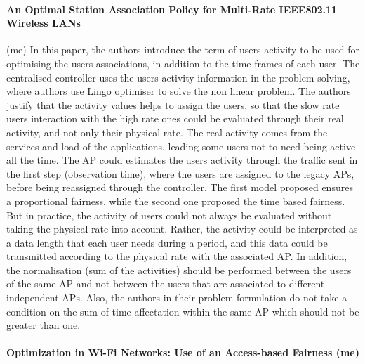 \documentclass[journal,transmag]{IEEEtran}
\begin{document}
\paragraph{An Optimal Station Association Policy for Multi-Rate IEEE802.11 Wireless LANs} (me) \cite{07optimal_association_MSWIM}
In this paper, the authors introduce the term of users activity to be used for optimising the users associations, in addition to the time frames of each user. The centralised controller uses the users activity information in the problem solving, where authors use Lingo optimiser to solve the non linear problem. The authors justify that the activity values helps to assign the users, so that the slow rate users interaction with the high rate ones could be evaluated through their real activity, and not only their physical rate. The real activity comes from the services and load of the applications, leading some users not to need being active all the time. The AP could estimates the users activity through the traffic sent in the first step (observation time), where the users are assigned to the legacy APs, before being reassigned through the controller. The first model proposed ensures a proportional fairness, while the second one proposed the time based fairness. But in practice, the activity of users could not always be evaluated without taking the physical rate into account. Rather, the activity could be interpreted as a data length that each user needs during a period, and this data could be transmitted according to the physical rate with the associated AP. In addition, the normalisation (sum of the activities) should be performed between the users of the same AP and not between the users that are associated to different independent APs. Also, the authors in their problem formulation do not take a condition on the sum of time affectation within the same AP which should not be greater than one.   \\



\paragraph{Optimization in Wi-Fi Networks: Use of an Access-based Fairness \cite{16AP_association_optimisation_fairness} (me)}
\end{document}
